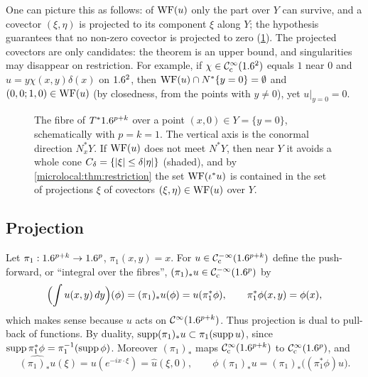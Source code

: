 One can picture this as follows: of $\operatorname{WF}(u)$ only the part over $Y$ can
survive, and a covector $(\xi,\eta)$ is projected to its component $\xi$
along $Y$; the hypothesis guarantees that no non-zero covector is projected
to zero (\cref{microlocal:fig:restriction}). The projected covectors are only
candidates: the theorem is an upper bound, and singularities may disappear
on restriction. For example, if $\chi\in\mathcal{C}^\infty_{\mathrm{c}}(1.6^2)$ equals $1$ near $0$ and
$u=y\chi(x,y)\delta(x)$ on $1.6^2$, then $\operatorname{WF}(u)\cap N^*\{y=0\}=\emptyset$ and
$(0,0;1,0)\in\operatorname{WF}(u)$ (by closedness, from the points with $y\ne0$), yet
$u|_{y=0}=0$.

\begin{figure}[htbp]
\centering
{}
\caption[Restriction to a submanifold]{The fibre of $T^*1.6^{p+k}$ over a point
$(x,0)\in Y=\{y=0\}$, schematically with $p=k=1$. The vertical axis is the
conormal direction $N^*_xY$. If $\operatorname{WF}(u)$ does not meet $N^*Y$, then near $Y$
it avoids a whole cone $C_\delta=\{\lvert \xi\rvert\le\delta\lvert \eta\rvert\}$ (shaded), and
by \cref{microlocal:thm:restriction} the set $\operatorname{WF}(\iota^*u)$ is contained in
the set of projections $\xi$ of covectors $(\xi,\eta)\in\operatorname{WF}(u)$ over $Y$.}
\label{microlocal:fig:restriction}
\end{figure}

\subsection{Projection}
Let $\pi_1:1.6^{p+k}\to1.6^p$, $\pi_1(x,y)=x$. For $u\in\mathcal{C}^{-\infty}_{\mathrm{c}}(1.6^{p+k})$ define
the push-forward, or ``integral over the fibres'', $(\pi_1)_*u\in\mathcal{C}^{-\infty}_{\mathrm{c}}(1.6^p)$
by
\begin{equation*}
  \Bigl(\int u(x,y)\,dy\Bigr)(\phi)=(\pi_1)_*u(\phi)=u(\pi_1^*\phi),\qquad
  \pi_1^*\phi(x,y)=\phi(x),
\end{equation*}
which makes sense because $u$ acts on $\mathcal{C}^\infty(1.6^{p+k})$. Thus projection is
dual to pull-back of functions. By duality,
$\operatorname{supp}(\pi_1)_*u\subset\pi_1(\operatorname{supp} u)$, since $\operatorname{supp}\pi_1^*\phi=\pi_1^{-1}(\operatorname{supp}\phi)$.
Moreover $(\pi_1)_*$ maps $\mathcal{C}^\infty_{\mathrm{c}}(1.6^{p+k})$ to $\mathcal{C}^\infty_{\mathrm{c}}(1.6^p)$, and
\begin{equation}\label{microlocal:eq:projection-ft}
  \widehat{(\pi_1)_*u}(\xi)=u(e^{-ix\cdot\xi})=\hat u(\xi,0),\qquad
  \phi\,(\pi_1)_*u=(\pi_1)_*\bigl((\pi_1^*\phi)u\bigr).
\end{equation}


